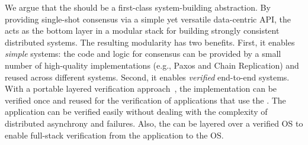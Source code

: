We argue that the \WOR{} should be a first-class system-building abstraction. By providing single-shot consensus via a simple yet versatile data-centric API, the \WOR{} acts as the bottom layer in a modular stack for building strongly consistent distributed systems. The resulting modularity has two benefits. First, it enables \textit{simple} systems: the code and logic for consensus can be provided by a small number of high-quality implementations (e.g., Paxos and Chain Replication) and reused across different systems. Second, it enables \textit{verified} end-to-end systems. With a portable layered verification approach~\cite{deepspec, concurrency}, the \WOR{} implementation can be verified once and reused for the verification of applications that use the \WOR{}. The application can be verified easily without dealing with the complexity of distributed asynchrony and failures. Also, the \WOR{} can be layered over a verified OS to enable full-stack verification from the application to the OS. 



